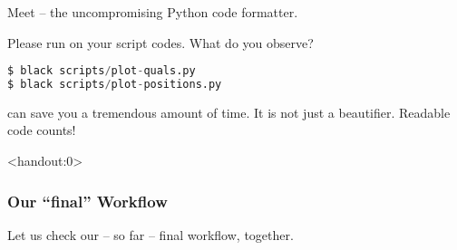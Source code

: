 \begin{frame}[fragile]
	\frametitle{}
	Meet  -- the uncompromising Python code formatter.
	\pause
	\begin{task}
		Please run  on your script codes. What do you observe?
	\end{task}
	
	\begin{lstlisting}[language=Python,style=Python]
$ black scripts/plot-quals.py
$ black scripts/plot-positions.py
    \end{lstlisting}	
    \pause
    \begin{hint}
    	 can save you a tremendous amount of time. It is not just a beautifier. Readable code counts!
    \end{hint}
\end{frame}

\begin{frame}<handout:0>
	\frametitle{Our ``final'' Workflow}
	Let us check our -- so far -- final workflow, together.
\end{frame}







